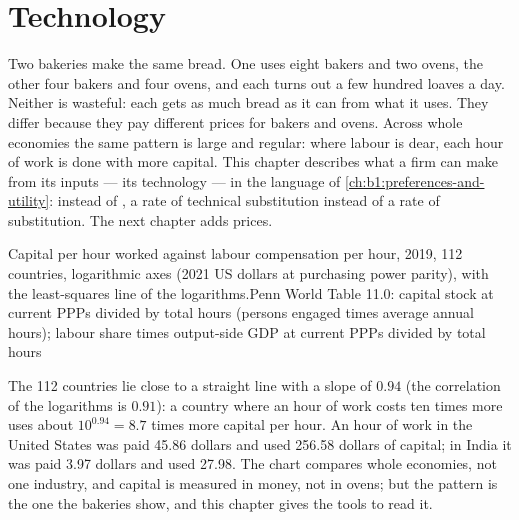 \chapter{Technology}\label{ch:b1:technology}

Two bakeries make the same bread. One uses eight bakers and two ovens, the
other four bakers and four ovens, and each turns out a few hundred loaves a
day. Neither is wasteful: each gets as much bread as it can from what it
uses. They differ because they pay different prices for bakers and ovens.
Across whole economies the same pattern is large and regular: where labour
is dear, each hour of work is done with more capital. This chapter
describes what a firm can make from its inputs --- its technology --- in the
language of \cref{ch:b1:preferences-and-utility}:  instead of
, a rate of technical substitution instead of a rate of
substitution. The next chapter adds prices.

\begin{openingchart}{Capital per hour worked against labour compensation per
hour, 2019, 112 countries, logarithmic axes (2021 US dollars at purchasing
power parity), with the least-squares line of the logarithms.}{Penn World
Table 11.0: capital stock at current PPPs divided by total hours (persons
engaged times average annual hours); labour share times output-side GDP at
current PPPs divided by total hours}
\end{openingchart}

The 112 countries lie close to a straight line with a slope of $0.94$ (the
correlation of the logarithms is $0.91$): a country where an hour of work
costs ten times more uses about $10^{0.94} = 8.7$ times more capital per hour.
An hour of work in the United States was paid 45.86 dollars and used 256.58
dollars of capital; in India it was paid 3.97 dollars and used 27.98.
The chart compares whole economies, not one industry, and capital is
measured in money, not in ovens; but the pattern is the one the bakeries
show, and this chapter gives the tools to read it.

